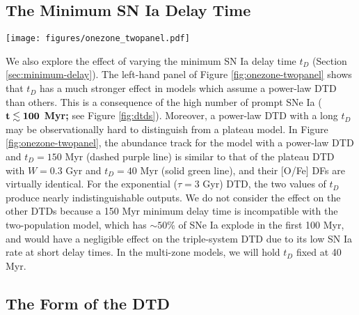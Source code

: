 \documentclass[twocolumn,twocolappendix,linenumbers]{aastex631}
\begin{document}
\subsection{\bf The Minimum SN Ia Delay Time}
\label{sec:onezone-minimum-delay}

\begin{figure*}
    \centering
    \texttt{[image: figures/onezone\_twopanel.pdf]}
    \caption{\textit{Left:} Comparison of one-zone models with different combinations of minimum delay time $t_D$ and DTD shape.
    The layout is similar to Figure \ref{fig:onezone-threepanel}. For visual clarity, we assume a mass-loading factor $\eta=1$ for the exponential DTD curves, which places the end-point of the abundance tracks at higher [Fe/H].
    \textit{Right:} Comparison of one-zone models with five different DTD models (see Figure \ref{fig:dtds}).
    }
    \label{fig:onezone-twopanel}
\end{figure*}

We also explore the effect of varying the minimum SN Ia delay time $t_D$ (Section \ref{sec:minimum-delay}).
The left-hand panel of Figure \ref{fig:onezone-twopanel} shows that $t_D$ has a much stronger effect in models which assume a power-law DTD than others. This is a consequence of the high number of prompt SNe Ia ({\bf $\bf t\lesssim100$ Myr;} see Figure \ref{fig:dtds}). Moreover, a power-law DTD with a long $t_D$ may be observationally hard to distinguish from a plateau model. In Figure \ref{fig:onezone-twopanel}, the abundance track for the model with a power-law DTD and $t_D=150$ Myr (dashed purple line) is similar to that of the plateau DTD with $W=0.3$ Gyr and $t_D=40$ Myr (solid green line), and their [O/Fe] DFs are virtually identical. For the exponential ($\tau=3$ Gyr) DTD, the two values of $t_D$ produce nearly indistinguishable outputs. We do not consider the effect on the other DTDs because a 150 Myr minimum delay time is incompatible with the two-population model, which has $\sim 50$\% of SNe Ia explode in the first 100 Myr, and would have a negligible effect on the triple-system DTD due to its low SN Ia rate at short delay times.
In the multi-zone models, we will hold $t_D$ fixed at 40 Myr.

\subsection{\bf The Form of the DTD}
\label{sec:onezone-dtd-form}
\end{document}
